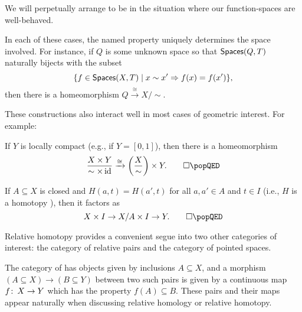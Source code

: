 \noindent
We will perpetually arrange to be in the situation where our function-spaces are well-behaved.

\begin{remark}
In each of these cases, the named property uniquely determines the space involved.
For instance, if $Q$ is some unknown space so that $\mathsf{Spaces}(Q, T)$ naturally bijects with the subset \[\{f \in \mathsf{Spaces}(X, T) \mid x \sim x' \Rightarrow f(x) = f(x') \},\] then there is a homeomorphism $Q \xrightarrow\cong X/\sim$.
\end{remark}

\noindent
These constructions also interact well in most cases of geometric interest.
For example:

\begin{lemma}\label{ProdQuotInterchange}\pushQED{\qed}
If $Y$ is locally compact (e.g., if $Y = [0, 1]$), then there is a homeomorphism \[\frac{X \times Y}{\sim \times \id} \xrightarrow{\cong} \left( \frac{X}{\sim}\right) \times Y. \qedhere \popQED\]
\end{lemma}



\begin{corollary}\pushQED{\qed}
If $A \subseteq X$ is closed and $H(a, t) = H(a', t)$ for all $a, a' \in A$ and $t \in I$ (i.e., $H$ is a homotopy ), then it factors as
\[X \times I \to X/A \times I \to Y. \qedhere \popQED\]
\end{corollary}

Relative homotopy provides a convenient segue into two other categories of interest: the category of relative pairs and the category of pointed spaces.

\begin{definition}
The category of  has objects given by inclusions $A \subseteq X$, and a morphism $(A \subseteq X) \to (B \subseteq Y)$ between two such pairs is given by a continuous map $f\colon\thinspace X \to Y$ which has the property $f(A) \subseteq B$.
These pairs and their maps appear naturally when discussing relative homology or relative homotopy.
\end{definition}

